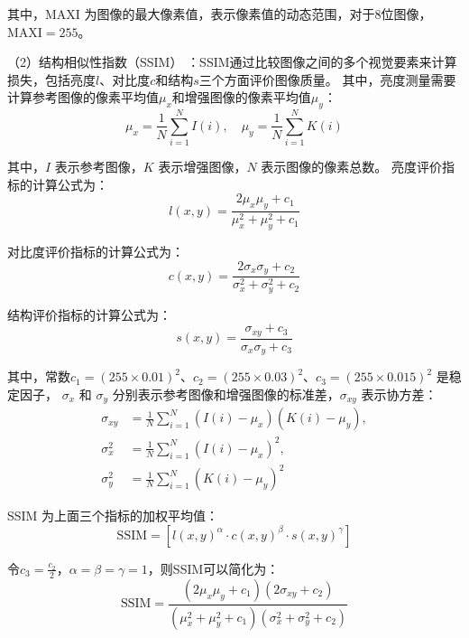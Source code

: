 其中，$\mathrm{MAXI}$ 为图像的最大像素值，表示像素值的动态范围，对于8位图像，$\mathrm{MAXI}=255$。

（2）结构相似性指数（SSIM） \cite{ssim}：SSIM通过比较图像之间的多个视觉要素来计算损失，包括亮度$l$、对比度$c$和结构$s$三个方面评价图像质量。
其中，亮度测量需要计算参考图像的像素平均值$\mu_x$和增强图像的像素平均值$\mu_y$：
\begin{equation}
    \mu_x = \frac{1}{N} \sum_{i=1}^{N} I(i) , \quad \mu_y = \frac{1}{N} \sum_{i=1}^{N} K(i)
\end{equation}

其中，$I$ 表示参考图像，$K$ 表示增强图像，$N$ 表示图像的像素总数。
亮度评价指标的计算公式为：
\begin{equation}
    l(x, y) = \frac{2\mu_x\mu_y + c_1}{\mu_x^2 + \mu_y^2 + c_1}
\end{equation}

对比度评价指标的计算公式为：
\begin{equation}
    c(x, y) = \frac{2\sigma_x\sigma_y + c_2}{\sigma_x^2 + \sigma_y^2 + c_2}
\end{equation}

结构评价指标的计算公式为：
\begin{equation}
    s(x, y) = \frac{{\sigma_{xy} + c_3}}{{\sigma_x\sigma_y + c_3}}
\end{equation}

其中，常数$c_1=(255\times0.01)^2$、$c_2=(255\times0.03)^2$、$c_3=(255\times0.015)^2$ 是稳定因子，
$\sigma_x$ 和 $\sigma_y$ 分别表示参考图像和增强图像的标准差，$\sigma_{xy}$ 表示协方差：
\begin{equation}
    \begin{split}
    \sigma_{xy} &= \frac{1}{N} \sum_{i=1}^{N} (I(i) - \mu_x)(K(i) - \mu_y), \\
    \sigma_x^2 &= \frac{1}{N} \sum_{i=1}^{N} (I(i) - \mu_x)^2, \\
    \sigma_y^2 &= \frac{1}{N} \sum_{i=1}^{N} (K(i) - \mu_y)^2
    \end{split}
\end{equation}

SSIM 为上面三个指标的加权平均值：
\begin{equation}
    \mathrm{SSIM} = [{{l(x,y)}^\alpha} \cdot {{c(x,y)}^\beta} \cdot {{s(x,y)}^\gamma} ]
\end{equation}

令$c_3=\frac{c_2}{2}$，$\alpha=\beta=\gamma=1$，则SSIM可以简化为：
\begin{equation}
    \mathrm{SSIM} = \frac{{(2\mu_x\mu_y + c_1)(2\sigma_{xy} + c_2)}}{{(\mu_x^2 + \mu_y^2 + c_1)(\sigma_x^2 + \sigma_y^2 + c_2)}}
\end{equation}

